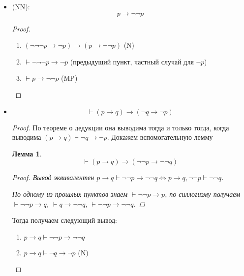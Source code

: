 \documentclass[12pt]{article}
\let\im\rightarrow
\let\n\neg
\theoremstyle{definition}
\theoremstyle{plain}
\newtheorem{lemma}{Лемма}[section]
\theoremstyle{remark}
\begin{document}
\begin{itemize}
\begin{proof}
\begin{enumerate}
        \item $(\n p \im \n\n\n p) \im (\n\n p \im p)$ (N)

        \item $\n\n p \vdash \n\n p \im p$ (т.к. умеем выводить $\n p
          \im \n\n\n p$ из $\n\n p$)

        \item $\n\n p \vdash p$
      \end{enumerate}
    \end{proof}

  \item (NN):
    \[
      p \im \n\n p
    \]
    \begin{proof}
      \begin{enumerate}
        \item $(\n\n\n p \im \n p) \im (p \im \n\n p)$ (N)

        \item $\vdash \n\n\n p \im \n p$ (предыдущий пункт, частный
          случай для $\n p$)

        \item $\vdash p \im \n\n p$ (MP)
      \end{enumerate}
    \end{proof}

  \item
    \[
      \vdash (p \im q) \im (\n q \im \n p)
    \]
    \begin{proof}
      По теореме о дедукции она выводима тогда и только тогда, когда
      выводима $(p \im q) \vdash \n q \im \n p$. Докажем вспомогательную лемму
      \begin{lemma}
        \[
          \vdash (p \im q) \im (\n\n p \im \n\n q)
        \]
        \begin{proof}
          Вывод эквивалентен $p \im q \vdash \n\n p \im \n\n q \iff p
          \im q, \n\n p \vdash \n\n q$.

          По одному из прошлых пунктов знаем $\vdash \n\n p \im p$,
          по силлогизму получаем $\vdash \n\n p \im q$, $\vdash q \im
          \n\n q$, $\vdash \n\n p \im \n\n q$.
        \end{proof}
      \end{lemma}
      Тогда получаем следующий вывод:
      \begin{enumerate}
        \item $p \im q \vdash \n\n p \im \n\n q$

        \item $p \im q \vdash \n q \im \n p$ (N)
      \end{enumerate}
    \end{proof}


\end{itemize}
\end{document}
